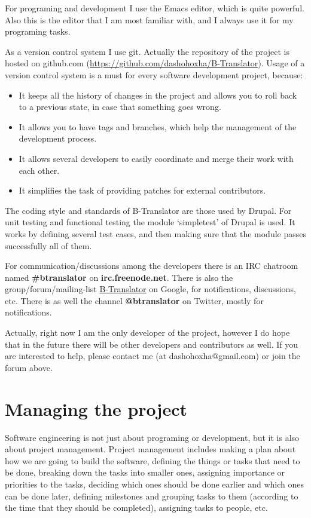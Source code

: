 \documentclass[11pt]{article}
\begin{document}
  For programing and development I use the Emacs editor, which is
  quite powerful. Also this is the editor that I am most familiar
  with, and I always use it for my programing tasks.

  As a version control system I use git. Actually the repository of
  the project is hosted on github.com
  (\href{https://github.com/dashohoxha/B-Translator}{https://github.com/dashohoxha/B-Translator}). Usage of a version control
  system is a must for every software development project, because:
\begin{itemize}
\item It keeps all the history of changes in the project and allows you
    to roll back to a previous state, in case that something goes
    wrong.
\item It allows you to have tags and branches, which help the management
    of the development process.
\item It allows several developers to easily coordinate and merge their
    work with each other.
\item It simplifies the task of providing patches for external
    contributors.
\end{itemize}
  The coding style and standards of B-Translator are those used by
  Drupal.  For unit testing and functional testing the module
  `simpletest' of Drupal is used. It works by defining several test
  cases, and then making sure that the module passes successfully all
  of them.

  For communication/discussions among the developers there is an IRC
  chatroom named \textbf{\#btranslator} on \textbf{irc.freenode.net}. There is also
  the group/forum/mailing-list \href{https://groups.google.com/forum/?hl=en&fromgroups#!categories/btranslator}{B-Translator} on Google, for
  notifications, discussions, etc. There is as well the channel
  \textbf{@btranslator} on Twitter, mostly for notifications.

  Actually, right now I am the only developer of the project, however
  I do hope that in the future there will be other developers and
  contributors as well. If you are interested to help, please contact
  me (at dashohoxha@gmail.com) or join the forum above.


\section{Managing the project}
\label{sec-7}


  Software engineering is not just about programing or development,
  but it is also about project management. Project management includes
  making a plan about how we are going to build the software, defining
  the things or tasks that need to be done, breaking down the tasks
  into smaller ones, assigning importance or priorities to the tasks,
  deciding which ones should be done earlier and which ones can be
  done later, defining milestones and grouping tasks to them
  (according to the time that they should be completed), assigning
  tasks to people, etc.
\end{document}
